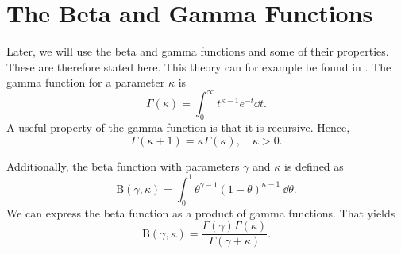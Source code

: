 \section{The Beta and Gamma Functions}


Later, we will use the beta and gamma functions and some of their properties. These are therefore stated here. This theory can for example be found in \citet{statinf}. The gamma function for a parameter $\kappa$ is 
\begin{equation*}
    \label{gamma_func}
    \Gamma(\kappa) = \int_0^\infty t^{\kappa-1}e^{-t} \dd t.
\end{equation*}
A useful property of the gamma function is that it is recursive. Hence,
\begin{equation}
\label{gamma_recursive_property}
    \Gamma(\kappa+1) = \kappa \Gamma(\kappa), \quad \kappa>0 .
\end{equation}

Additionally, the beta function with parameters $\gamma$ and $\kappa$ is defined as
\begin{equation}
\label{beta_function}
    \mathrm{B}(\gamma,\kappa) = \int_0^1 \theta^{\gamma-1}(1-\theta)^{\kappa-1} \: \dd \theta.
\end{equation}
We can express the beta function as a product of gamma functions. That yields
\begin{equation}
\label{beta_as_gamma}
    \mathrm{B}(\gamma,\kappa) = \frac{\Gamma(\gamma)\Gamma(\kappa)}{\Gamma(\gamma+\kappa)}.
\end{equation}



